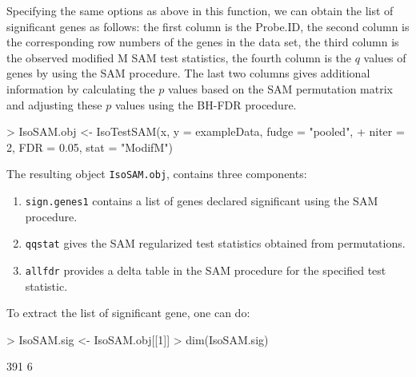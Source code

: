 \documentclass[10pt]{article}
\begin{document}
Specifying the same options as above in this function, we can obtain the list of significant genes as follows: the first column is the Probe.ID, the second column is the corresponding row numbers of the genes in the data set, the third column is the observed modified M SAM test statistics, the fourth column is the $q$ values of genes by using the SAM procedure. The last two columns gives additional information by calculating the $p$ values based on the SAM permutation matrix and adjusting these $p$ values using the BH-FDR procedure.


\begin{Schunk}
\begin{Sinput}
> IsoSAM.obj <- IsoTestSAM(x, y = exampleData, fudge = "pooled", 
+     niter = 2, FDR = 0.05, stat = "ModifM")
\end{Sinput}
\end{Schunk}


The resulting object \texttt{IsoSAM.obj},  contains three components:
\begin{enumerate}
\item \texttt{sign.genes1} contains a list of genes declared significant using the SAM procedure.
\item \texttt{qqstat} gives the SAM regularized test statistics obtained from permutations.
\item \texttt{allfdr} provides a delta table in the SAM procedure for the specified test statistic.
\end{enumerate}

To extract the list of significant gene, one can do:
\begin{Schunk}
\begin{Sinput}
> IsoSAM.sig <- IsoSAM.obj[[1]]
> dim(IsoSAM.sig)
\end{Sinput}
\begin{Soutput}
[1] 391   6
\end{Soutput}
\end{Schunk}
\end{document}
